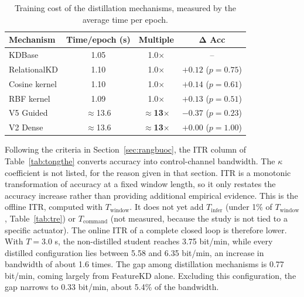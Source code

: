\begin{table}[!htbp]
\centering
\caption{Training cost of the distillation mechanisms, measured by
the average time per epoch.}
\label{tab:chiphi}
\begin{tabular}{lccc}
\toprule
\textbf{Mechanism} & \textbf{Time/epoch (s)} & \textbf{Multiple} & $\boldsymbol{\Delta}$ \textbf{Acc} \\
\midrule
KDBase & 1.05 & 1.0$\times$ & -- \\
RelationalKD & 1.10 & 1.0$\times$ & $+0.12$ ($p = 0.75$) \\
Cosine kernel & 1.10 & 1.0$\times$ & $+0.14$ ($p = 0.61$) \\
RBF kernel & 1.09 & 1.0$\times$ & $+0.13$ ($p = 0.51$) \\
V5 Guided & $\approx$13.6 & \textbf{$\approx$13}$\boldsymbol{\times}$ & $-0.37$ ($p = 0.23$) \\
V2 Dense & $\approx$13.6 & \textbf{$\approx$13}$\boldsymbol{\times}$ & $+0.00$ ($p = 1.00$) \\
\bottomrule
\end{tabular}
\end{table}
\FloatBarrier

Following the criteria in Section~\ref{sec:rangbuoc}, the ITR column of
Table~\ref{tab:tongthe} converts accuracy into control-channel
bandwidth. The $\kappa$ coefficient is not listed, for the reason given
in that section. ITR is a monotonic transformation of accuracy at a
fixed window length, so it only restates the accuracy increase rather
than providing additional empirical evidence. This is the offline ITR,
computed with $T_{\mathrm{window}}$. It does not yet add
$T_{\mathrm{infer}}$ (under 1\% of $T_{\mathrm{window}}$,
Table~\ref{tab:tre}) or $T_{\mathrm{command}}$ (not measured, because
the study is not tied to a specific actuator). The online ITR of a
complete closed loop is therefore lower. With $T = 3.0$ s, the
non-distilled student reaches 3.75 bit/min, while every distilled
configuration lies between 5.58 and 6.35 bit/min, an increase in
bandwidth of about 1.6 times. The gap among distillation mechanisms is
0.77 bit/min, coming largely from FeatureKD alone. Excluding this
configuration, the gap narrows to 0.33 bit/min, about 5.4\% of the
bandwidth.

